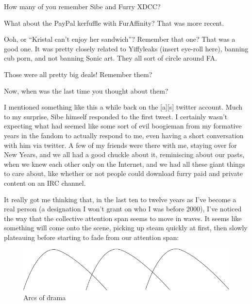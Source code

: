 
How many of you remember Sibe and Furry XDCC?

What about the PayPal kerfuffle with FurAffinity?  That was more recent.

Ooh, or ``Kristal can't enjoy her sandwich''?  Remember that one?  That was a good one.  It was pretty closely related to Yiffyleaks (insert eye-roll here), banning cub porn, and not banning Sonic art.  They all sort of circle around FA.

Those were all pretty big deals!  Remember them?

Now, when was the last time you thought about them?

I mentioned something like this a while back on the [a][s] twitter account.  Much to my surprise, Sibe himself responded to the first tweet.  I certainly wasn't expecting what had seemed like some sort of evil boogieman from my formative years in the fandom to actually respond to me, even having a short conversation with him via twitter.  A few of my friends were there with me, staying over for New Years, and we all had a good chuckle about it, reminiscing about our pasts, when we knew each other only on the Internet, and we had all these giant things to care about, like whether or not people could download furry paid and private content on an IRC channel.

It really got me thinking that, in the last ten to twelve years as I've become a real person (a designation I won't grant on who I was before 2000), I've noticed the way that the collective attention span seems to move in waves.  It seems like something will come onto the scene, picking up steam quickly at first, then slowly plateauing before starting to fade from our attention span:

\begin{figure}
  \begin{center}
    \includegraphics[width=\textwidth]{content/assets/dramagogues--drama-arcs}
  \end{center}
  \caption{Arcs of drama}
\end{figure}


